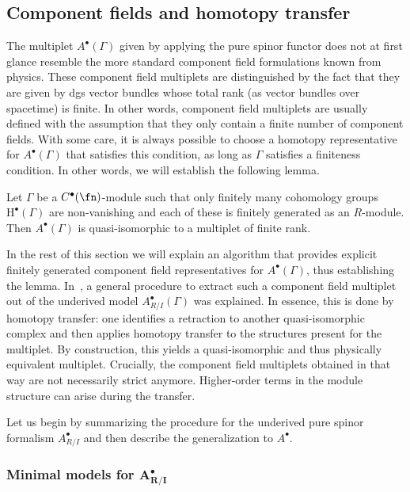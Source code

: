 \subsection{Component fields and homotopy transfer} \label{sec: components}
The multiplet $A^\bullet(\Gamma)$ given by applying the pure spinor functor does not at first glance resemble the more standard component field formulations known from physics. These component field multiplets are distinguished by the fact that they are given by dgs vector bundles whose total rank (as vector bundles over spacetime) is finite. In other words, component field multiplets are usually defined with the assumption that they only contain a finite number of component fields. With some care, it is always possible to choose a homotopy representative for $A^\bullet(\Gamma)$ that satisfies this condition, as long as $\Gamma$ satisfies a finiteness condition. In other words, we will establish the following lemma.

\begin{lem} \label{fd_model_lemma}
	Let $\Gamma$ be a $C^\bullet(\fn)$-module such that only finitely many cohomology groups $\mathrm{H}^\bullet(\Gamma)$ are non-vanishing and each of these is finitely generated as an $R$-module. Then $A^\bullet(\Gamma)$ is quasi-isomorphic to a multiplet of finite rank.
\end{lem}

In the rest of this section we will explain an algorithm that provides explicit finitely generated component field representatives for $A^\bullet(\Gamma)$, thus establishing the lemma. In~\cite{perspectives}, a general procedure to extract such a component field multiplet out of the underived model $A^\bullet_{R/I}(\Gamma)$ was explained. In essence, this is done by homotopy transfer: one identifies a retraction to another quasi-isomorphic complex and then applies homotopy transfer to the structures present for the multiplet. By construction, this yields a quasi-isomorphic and thus physically equivalent multiplet. Crucially, the component field multiplets obtained in that way are not necessarily strict anymore. Higher-order terms in the module structure can arise during the transfer.

Let us begin by summarizing the procedure for the underived pure spinor formalism $A^\bullet_{R/I}$ and then describe the generalization to $A^\bullet$.

\subsubsection[Minimal models for A\^{}bullet\_\{R/I\}]{Minimal models for $\boldsymbol{A^\bullet_{R/I}}$}

